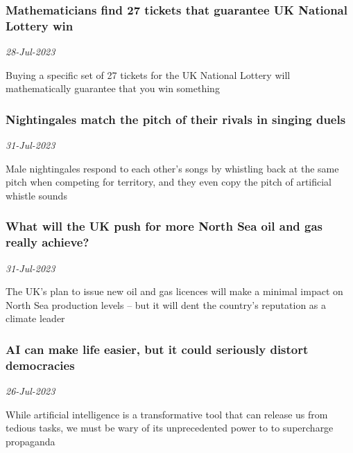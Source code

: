 \subsubsection{Mathematicians find 27 tickets that guarantee UK National Lottery win \href{https://www.newscientist.com/article/2384455-mathematicians-find-27-tickets-that-guarantee-uk-national-lottery-win/?utm_campaign=RSS%7CNSNS&utm_source=NSNS&utm_medium=RSS&utm_content=home}{}}
\textit{28-Jul-2023}

Buying a specific set of 27 tickets for the UK National Lottery will mathematically guarantee that you win something
\subsubsection{Nightingales match the pitch of their rivals in singing duels \href{https://www.newscientist.com/article/2385379-nightingales-match-the-pitch-of-their-rivals-in-singing-duels/?utm_campaign=RSS%7CNSNS&utm_source=NSNS&utm_medium=RSS&utm_content=home}{\ding{225}}}
\textit{31-Jul-2023}

Male nightingales respond to each other’s songs by whistling back at the same pitch when competing for territory, and they even copy the pitch of artificial whistle sounds
\subsubsection{What will the UK push for more North Sea oil and gas really achieve? \href{https://www.newscientist.com/article/2385452-what-will-the-uk-push-for-more-north-sea-oil-and-gas-really-achieve/?utm_campaign=RSS%7CNSNS&utm_source=NSNS&utm_medium=RSS&utm_content=home}{}}
\textit{31-Jul-2023}

The UK’s plan to issue new oil and gas licences will make a minimal impact on North Sea production levels – but it will dent the country's reputation as a climate leader
\subsubsection{AI can make life easier, but it could seriously distort democracies \href{https://www.newscientist.com/article/mg25934493-600-ai-can-make-life-easier-but-it-could-seriously-distort-democracies/?utm_campaign=RSS%7CNSNS&utm_source=NSNS&utm_medium=RSS&utm_content=home}{\ding{225}}}
\textit{26-Jul-2023}

While artificial intelligence is a transformative tool that can release us from tedious tasks, we must be wary of its unprecedented power to to supercharge propaganda
